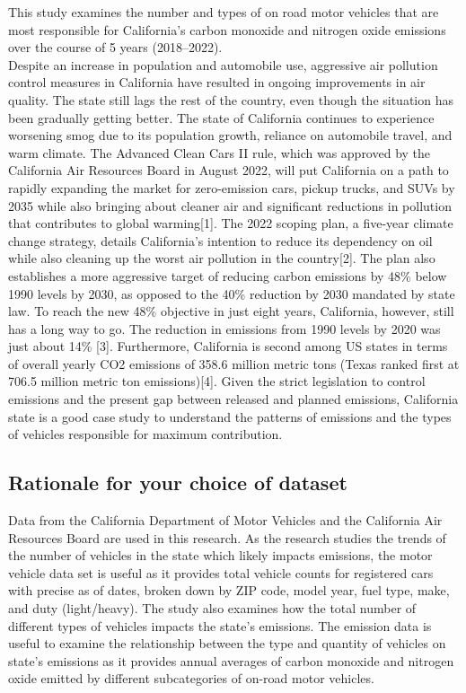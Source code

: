 \documentclass[
  12pt,
]{article}
\begin{document}
This study examines the number and types of on road motor vehicles that
are most responsible for California's carbon monoxide and nitrogen oxide
emissions over the course of 5 years (2018--2022).\\
Despite an increase in population and automobile use, aggressive air
pollution control measures in California have resulted in ongoing
improvements in air quality. The state still lags the rest of the
country, even though the situation has been gradually getting better.
The state of California continues to experience worsening smog due to
its population growth, reliance on automobile travel, and warm climate.
The Advanced Clean Cars II rule, which was approved by the California
Air Resources Board in August 2022, will put California on a path to
rapidly expanding the market for zero-emission cars, pickup trucks, and
SUVs by 2035 while also bringing about cleaner air and significant
reductions in pollution that contributes to global warming{[}1{]}. The
2022 scoping plan, a five-year climate change strategy, details
California's intention to reduce its dependency on oil while also
cleaning up the worst air pollution in the country{[}2{]}. The plan also
establishes a more aggressive target of reducing carbon emissions by
48\% below 1990 levels by 2030, as opposed to the 40\% reduction by 2030
mandated by state law. To reach the new 48\% objective in just eight
years, California, however, still has a long way to go. The reduction in
emissions from 1990 levels by 2020 was just about 14\% {[}3{]}.
Furthermore, California is second among US states in terms of overall
yearly CO2 emissions of 358.6 million metric tons (Texas ranked first at
706.5 million metric ton emissions){[}4{]}. Given the strict legislation
to control emissions and the present gap between released and planned
emissions, California state is a good case study to understand the
patterns of emissions and the types of vehicles responsible for maximum
contribution.

\hypertarget{rationale-for-your-choice-of-dataset}{%
\subsection{Rationale for your choice of
dataset}\label{rationale-for-your-choice-of-dataset}}

Data from the California Department of Motor Vehicles and the California
Air Resources Board are used in this research. As the research studies
the trends of the number of vehicles in the state which likely impacts
emissions, the motor vehicle data set is useful as it provides total
vehicle counts for registered cars with precise as of dates, broken down
by ZIP code, model year, fuel type, make, and duty (light/heavy). The
study also examines how the total number of different types of vehicles
impacts the state's emissions. The emission data is useful to examine
the relationship between the type and quantity of vehicles on state's
emissions as it provides annual averages of carbon monoxide and nitrogen
oxide emitted by different subcategories of on-road motor vehicles.
\end{document}
